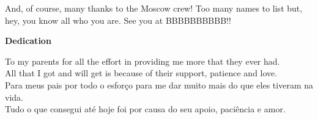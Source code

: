 And, of course, many thanks to the Moscow crew! Too many names to list but, hey, you know all who you are. See you at BBBBBBBBBB!!

\pagebreak

\vspace*{\fill} %
\begin{center} %

\begin{large}
\textbf{Dedication} \\
\end{large}
\indent To my parents for all the effort in providing me more that they ever had. \\
\indent All that I got and will get is because of their support, patience and love. \\
\indent Para meus pais por todo o esforço para me dar muito mais do que eles tiveram na vida. \\
\indent Tudo o que consegui até hoje foi por causa do seu apoio, paciência e amor.

\end{center}
\vspace*{\fill}
\pagebreak

\tableofcontents
\pagebreak

\listoftables
\pagebreak

\listoffigures
\pagebreak